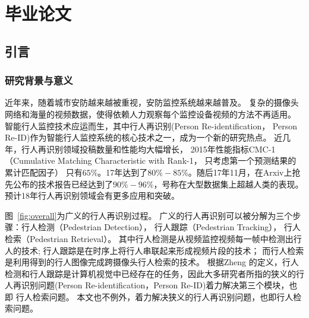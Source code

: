 ﻿%

%
\part{毕业论文}

\chapter{引言}

\section{研究背景与意义}

近年来，随着城市安防越来越被重视，安防监控系统越来越普及。
复杂的摄像头网络和海量的视频数据，使得依赖人力观察每个监控设备视频的方法不再适用。
智能行人监控技术应运而生，其中行人再识别(Person Re-identification， Person Re-ID)作为智能行人监控系统的核心技术之一，成为一个新的研究热点。
近几年，行人再识别领域投稿数量和性能均大幅增长，
2015年性能指标CMC-1（Cumulative Matching Characteristic with Rank-1， 只考虑第一个预测结果的累计匹配因子）
只有$65\%$。17年达到了$80\%-85\%$。随后17年11月，在Arxiv上抢先公布的技术报告已经达到了$90\%-96\%$，号称在大型数据集上超越人类的表现。预计18年行人再识别领域会有更多应用和突破。

图~\ref{fig:overall}为广义的行人再识别过程。
广义的行人再识别可以被分解为三个步骤：行人检测（Pedestrian Detection），
行人跟踪（Pedestrian Tracking），
行人检索（Pedestrian Retrieval）。
其中行人检测是从视频监控视频每一帧中检测出行人的技术;
行人跟踪是在时序上将行人串联起来形成视频片段的技术；
而行人检索是利用得到的行人图像完成跨摄像头行人检索的技术。
根据Zheng \etal \cite{zheng2017person}的定义，行人检测和行人跟踪是计算机视觉中已经存在的任务，因此大多研究者所指的狭义的行人再识别问题(Person Re-identification，Person Re-ID)着力解决第三个模块，也即
行人检索问题。
本文也不例外，着力解决狭义的行人再识别问题，也即行人检索问题。

